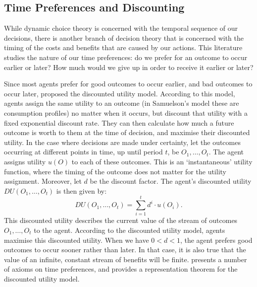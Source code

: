 \subsection{Time Preferences and Discounting}\label{subs72}

While dynamic choice theory is concerned with the temporal sequence of our decisions, there is another branch of decision theory that is concerned with the timing of the costs and benefits that are caused by our actions. This literature studies the nature of our time preferences: do we prefer for an outcome to occur earlier or later? How much would we give up in order to receive it earlier or later?

Since most agents prefer for good outcomes to occur earlier, and bad outcomes to occur later, \citet{Samuelson1937} proposed the discounted utility model. According to this model, agents assign the same utility to an outcome (in Samuelson's model these are consumption profiles) no matter when it occurs, but discount that utility with a fixed exponential discount rate. They can then calculate how much a future outcome is worth to them at the time of decision, and maximise their discounted utility. In the case where decisions are made under certainty, let the outcomes occurring at different points in time, up until period $t$, be $O_1, \ldots, O_t$. The agent assigns utility $u(O)$ to each of these outcomes. This is an `instantaneous' utility function, where the timing of the outcome does not matter for the utility assignment. Moreover, let $d$ be the discount factor. The agent's discounted utility $DU(O_1, \ldots, O_t)$ is then given by:
$$DU(O_1, \ldots, O_t) = \sum\limits_{i=1}^t d^i \cdot u (O_{i}).$$
This discounted utility describes the current value of the stream of outcomes $O_1, \ldots, O_t$ to the agent. According to the discounted utility model, agents maximise this discounted utility. When we have $0 < d < 1$, the agent prefers good outcomes to occur sooner rather than later. In that case, it is also true that the value of an infinite, constant stream of benefits will be finite. \citet{Koopmans1960} presents a number of axioms on time preferences, and provides a representation theorem for the discounted utility model.


